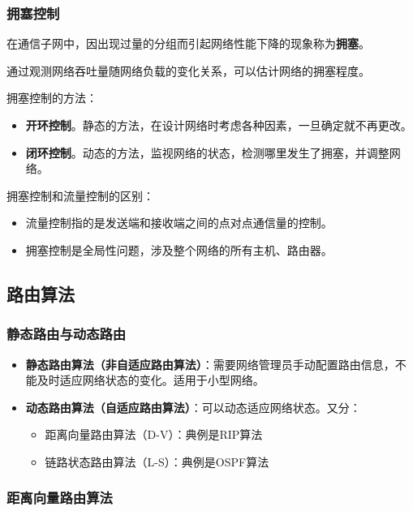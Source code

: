 \documentclass[12pt, a4paper, oneside]{ctexart}
\begin{document}
\subsubsection{拥塞控制}

在通信子网中，因出现过量的分组而引起网络性能下降的现象称为\textbf{拥塞}。

通过观测网络吞吐量随网络负载的变化关系，可以估计网络的拥塞程度。

拥塞控制的方法：
\begin{itemize}
    \item {\bf 开环控制}。静态的方法，在设计网络时考虑各种因素，一旦确定就不再更改。
    \item {\bf 闭环控制}。动态的方法，监视网络的状态，检测哪里发生了拥塞，并调整网络。
\end{itemize}

拥塞控制和流量控制的区别：
\begin{itemize}
    \item 流量控制指的是发送端和接收端之间的点对点通信量的控制。
    \item 拥塞控制是全局性问题，涉及整个网络的所有主机、路由器。
\end{itemize}

\subsection{路由算法}

\subsubsection{静态路由与动态路由}

\begin{itemize}
    \item {\bf 静态路由算法（非自适应路由算法）}：需要网络管理员手动配置路由信息，不能及时适应网络状态的变化。适用于小型网络。
    \item {\bf 动态路由算法（自适应路由算法）}：可以动态适应网络状态。又分：
    \begin{itemize}
        \item 距离向量路由算法（D-V）：典例是RIP算法
        \item 链路状态路由算法（L-S）：典例是OSPF算法
    \end{itemize}
\end{itemize}

\subsubsection{距离向量路由算法}
\end{document}
